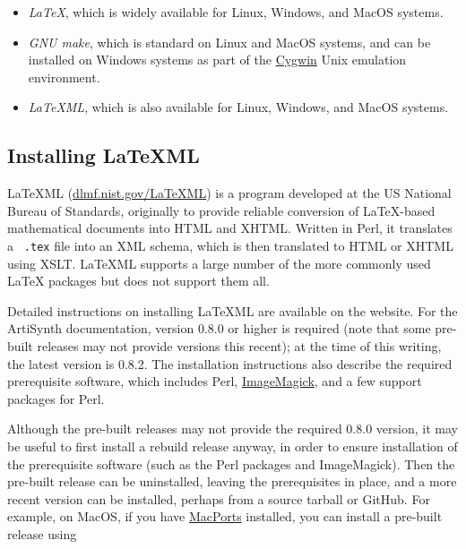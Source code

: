 \documentclass{article}
\begin{document}
\begin{itemize}

\item {\it LaTeX}, which is widely available for Linux, Windows,
and MacOS systems.

\item {\it GNU make}, which is standard on Linux and MacOS systems,
and can be installed on Windows systems as part of the 
\href{http://www.cygwin.com}{Cygwin} Unix emulation environment.

\item {\it LaTeXML}, which is also available for Linux, Windows, and
MacOS systems.  

\end{itemize}

\subsection{Installing LaTeXML}
\label{InstallingLaTeXMLSec}

LaTeXML (\href{http://dlmf.nist.gov/LaTeXML/}{dlmf.nist.gov/LaTeXML})
is a program developed at the US National Bureau of Standards,
originally to provide reliable conversion of LaTeX-based mathematical
documents into HTML and XHTML. Written in Perl, it translates a {\tt
.tex} file into an XML schema, which is then translated to HTML or
XHTML using XSLT. LaTeXML supports a large number of the more commonly
used LaTeX packages but does not support them all.

Detailed instructions on installing LaTeXML are available
on the website.  For the ArtiSynth documentation, version 0.8.0 or
higher is required (note that some pre-built releases may not provide
versions this recent); at the time of this writing, the latest version
is 0.8.2. The installation instructions also describe the required
prerequisite software, which includes Perl,
\href{http://www.imagemagick.org}{ImageMagick}, and a few support
packages for Perl.

Although the pre-built releases may not provide the required 0.8.0
version, it may be useful to first install a rebuild release anyway,
in order to ensure installation of the prerequisite software (such as
the Perl packages and ImageMagick). Then the pre-built release can be
uninstalled, leaving the prerequisites in place, and a more recent
version can be installed, perhaps from a source tarball or GitHub. For
example, on MacOS, if you have
\href{http://www.macports.org}{MacPorts} installed, you can install a
pre-built release using
\end{document}

